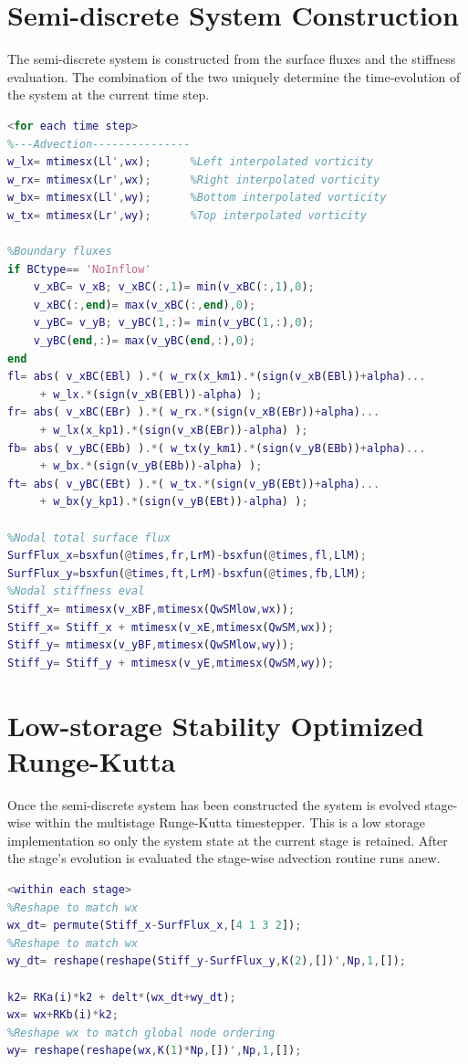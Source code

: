 \documentclass[letterpaper,12pt]{report}
\begin{document}
\section{Semi-discrete System Construction}
The semi-discrete system is constructed from the surface fluxes and the stiffness evaluation. The combination of the two uniquely determine the time-evolution of the system at the current time step.

\singlespacing
\begin{lstlisting}[language=Matlab]
<for each time step>
%---Advection---------------
w_lx= mtimesx(Ll',wx);      %Left interpolated vorticity
w_rx= mtimesx(Lr',wx);      %Right interpolated vorticity
w_bx= mtimesx(Ll',wy);      %Bottom interpolated vorticity
w_tx= mtimesx(Lr',wy);      %Top interpolated vorticity

%Boundary fluxes
if BCtype== 'NoInflow'
    v_xBC= v_xB; v_xBC(:,1)= min(v_xBC(:,1),0);
    v_xBC(:,end)= max(v_xBC(:,end),0);
    v_yBC= v_yB; v_yBC(1,:)= min(v_yBC(1,:),0);
    v_yBC(end,:)= max(v_yBC(end,:),0);
end
fl= abs( v_xBC(EBl) ).*( w_rx(x_km1).*(sign(v_xB(EBl))+alpha)...
	 + w_lx.*(sign(v_xB(EBl))-alpha) );
fr= abs( v_xBC(EBr) ).*( w_rx.*(sign(v_xB(EBr))+alpha)...
	 + w_lx(x_kp1).*(sign(v_xB(EBr))-alpha) );
fb= abs( v_yBC(EBb) ).*( w_tx(y_km1).*(sign(v_yB(EBb))+alpha)...
	 + w_bx.*(sign(v_yB(EBb))-alpha) );
ft= abs( v_yBC(EBt) ).*( w_tx.*(sign(v_yB(EBt))+alpha)...
	 + w_bx(y_kp1).*(sign(v_yB(EBt))-alpha) );

%Nodal total surface flux
SurfFlux_x=bsxfun(@times,fr,LrM)-bsxfun(@times,fl,LlM);
SurfFlux_y=bsxfun(@times,ft,LrM)-bsxfun(@times,fb,LlM);
%Nodal stiffness eval
Stiff_x= mtimesx(v_xBF,mtimesx(QwSMlow,wx));
Stiff_x= Stiff_x + mtimesx(v_xE,mtimesx(QwSM,wx));
Stiff_y= mtimesx(v_yBF,mtimesx(QwSMlow,wy));
Stiff_y= Stiff_y + mtimesx(v_yE,mtimesx(QwSM,wy));
\end{lstlisting}
\doublespacing

\section{Low-storage Stability Optimized Runge-Kutta}
Once the semi-discrete system has been constructed the system is evolved stage-wise within the multistage Runge-Kutta timestepper. This is a low storage implementation so only the system state at the current stage is retained. After the stage's evolution is evaluated the stage-wise advection routine runs anew.

\singlespacing
\begin{lstlisting}[language=Matlab]
<within each stage>
%Reshape to match wx
wx_dt= permute(Stiff_x-SurfFlux_x,[4 1 3 2]);
%Reshape to match wx
wy_dt= reshape(reshape(Stiff_y-SurfFlux_y,K(2),[])',Np,1,[]); 
        
k2= RKa(i)*k2 + delt*(wx_dt+wy_dt);
wx= wx+RKb(i)*k2;
%Reshape wx to match global node ordering
wy= reshape(reshape(wx,K(1)*Np,[])',Np,1,[]);
\end{lstlisting}
\doublespacing
%

\end{document}
